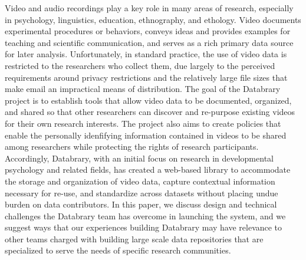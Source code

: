 \documentclass{sig-alternate}
\begin{document}

Video and audio recordings play a key role in many areas of research, especially in psychology, linguistics, education, ethnography, and ethology.
Video documents experimental procedures or behaviors, conveys ideas and provides examples for teaching and scientific communication, and serves as a rich primary data source for later analysis.
Unfortunately, in standard practice, the use of video data is restricted to the researchers who collect them, due largely to the perceived requirements around privacy restrictions and the relatively large file sizes that make email an impractical means of distribution.
The goal of the Databrary project is to establish tools that allow video data to be documented, organized, and shared so that other researchers can discover and re-purpose existing videos for their own research interests. The project also aims to create policies that enable the personally idenfifying information contained in videos to be shared among researchers while protecting the rights of research participants.
Accordingly, Databrary, with an initial focus on research in developmental psychology and related fields, has created a web-based library to accommodate the storage and organization of video data, capture contextual information necessary for re-use, and standardize across datasets without placing undue burden on data contributors.
In this paper, we discuss design and technical challenges the Databrary team has overcome in launching the system, and we suggest ways that our experiences building Databrary may have relevance to other teams charged with building large scale data repositories that are specialized to serve the needs of specific research communities.
\end{document}
